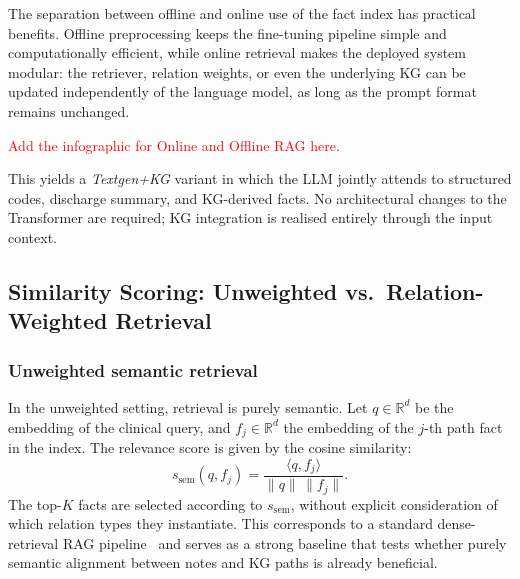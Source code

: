 The separation between offline and online use of the fact index has practical benefits. Offline preprocessing keeps the fine-tuning pipeline simple and computationally efficient, while online retrieval makes the deployed system modular: the retriever, relation weights, or even the underlying KG can be updated independently of the language model, as long as the prompt format remains unchanged.


\textcolor{red}{Add the infographic for Online and Offline RAG here.}

This yields a \emph{Textgen+KG} variant in which the LLM jointly attends to structured codes, discharge summary, and KG-derived facts. No architectural changes to the Transformer are required; KG integration is realised entirely through the input context.

\subsection{Similarity Scoring: Unweighted vs.\ Relation-Weighted Retrieval}
\label{subsec:similarity-scoring}

\subsubsection{Unweighted semantic retrieval}

In the unweighted setting, retrieval is purely semantic. Let $q \in \mathbb{R}^d$ be the embedding of the clinical query, and $f_j \in \mathbb{R}^d$ the embedding of the $j$-th path fact in the index. The relevance score is given by the cosine similarity:
\begin{equation}
    s_{\text{sem}}(q, f_j)
    =
    \frac{\langle q, f_j \rangle}{\|q\| \, \|f_j\|}.
\end{equation}
The top-$K$ facts are selected according to $s_{\text{sem}}$, without explicit consideration of which relation types they instantiate. This corresponds to a standard dense-retrieval RAG pipeline~\cite{lewis2020rag} and serves as a strong baseline that tests whether purely semantic alignment between notes and KG paths is already beneficial.

